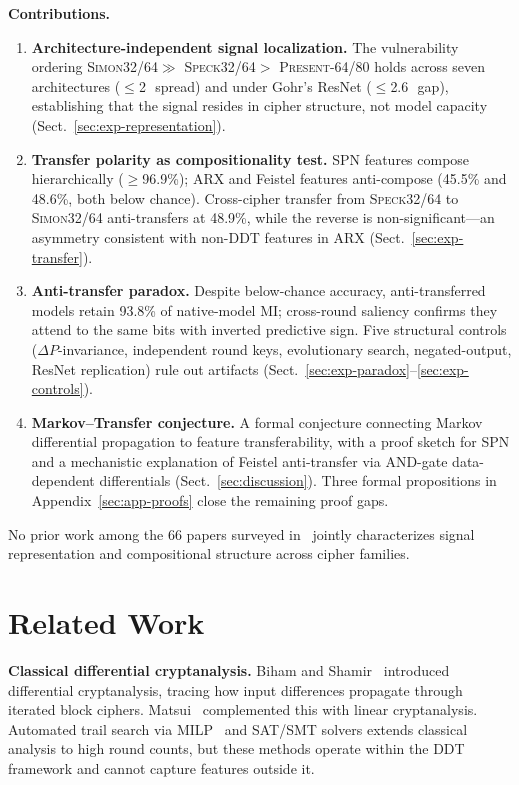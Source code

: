 \documentclass[runningheads]{llncs}
\newcommand{\speck}{\textsc{Speck32/64}\xspace}
\newcommand{\simon}{\textsc{Simon32/64}\xspace}
\newcommand{\present}{\textsc{Present-64/80}\xspace}
\newcommand{\pp}{\,\text{pp}}  %
\begin{document}
\smallskip\noindent\textbf{Contributions.}
\begin{enumerate}[leftmargin=*,itemsep=1pt,topsep=2pt]
  \item \textbf{Architecture-independent signal localization.} The vulnerability ordering \simon $\gg$ \speck $>$ \present holds across seven architectures ($\leq$2\pp\ spread) and under Gohr's ResNet ($\leq$2.6\pp\ gap), establishing that the signal resides in cipher structure, not model capacity (Sect.~\ref{sec:exp-representation}).
  \item \textbf{Transfer polarity as compositionality test.} SPN features compose hierarchically ($\geq$96.9\%); ARX and Feistel features anti-compose (45.5\% and 48.6\%, both below chance). Cross-cipher transfer from \speck to \simon anti-transfers at 48.9\%, while the reverse is non-significant---an asymmetry consistent with non-DDT features in ARX (Sect.~\ref{sec:exp-transfer}).
  \item \textbf{Anti-transfer paradox.} Despite below-chance accuracy, anti-transferred models retain 93.8\% of native-model MI; cross-round saliency confirms they attend to the same bits with inverted predictive sign. Five structural controls (\(\Delta P\)-invariance, independent round keys, evolutionary search, negated-output, ResNet replication) rule out artifacts (Sect.~\ref{sec:exp-paradox}--\ref{sec:exp-controls}).
  \item \textbf{Markov--Transfer conjecture.} A formal conjecture connecting Markov differential propagation to feature transferability, with a proof sketch for SPN and a mechanistic explanation of Feistel anti-transfer via AND-gate data-dependent differentials (Sect.~\ref{sec:discussion}). Three formal propositions in Appendix~\ref{sec:app-proofs} close the remaining proof gaps.
\end{enumerate}

\noindent No prior work among the 66 papers surveyed in~\cite{gerault2024sok} jointly characterizes signal representation and compositional structure across cipher families.


\section{Related Work}
\label{sec:related}

\textbf{Classical differential cryptanalysis.}
Biham and Shamir~\cite{biham1991differential} introduced differential cryptanalysis, tracing how input differences propagate through iterated block ciphers.
Matsui~\cite{matsui1993linear} complemented this with linear cryptanalysis.
Automated trail search via MILP~\cite{mouha2012milp} and SAT/SMT solvers extends classical analysis to high round counts, but these methods operate within the DDT framework and cannot capture features outside it.
\end{document}
